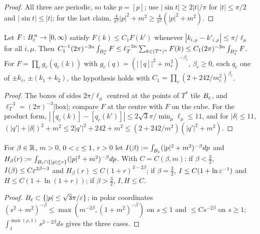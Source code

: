 \begin{proof}
All three are periodic, so take $p=[p]$; use $|\sin t|\ge2|t|/\pi$ for $|t|\le\pi/2$ and $|\sin t|\le|t|$; for the last claim, $\frac4{\pi^2}|p|^2+m^2\ge\frac4{\pi^2}(|p|^2+m^2)$.
\end{proof}

\begin{lemma}\label{lem:a06e:M1}
Let $F\colon B_{\varepsilon}^{\,n}\to[0,\infty)$ satisfy $F(k)\le C_1F(k')$ whenever $|k_{i,\mu}-k'_{i,\mu}|\le\pi/\ell_\mu$ for all $i,\mu$. Then $C_1^{-1}(2\pi)^{-3n}\int_{B_{\varepsilon}^n}F\le\ell_T^{-3n}\sum_{k\in(T^*)^n}F(k)\le C_1(2\pi)^{-3n}\int_{B_{\varepsilon}^n}F$. For $F=\prod_cg_c(q_c(k))$ with $g_c(q)=(|[q]|^2+m_c^2)^{-\beta_c}$, $\beta_c\ge0$, each $q_c$ one of $\pm k_i$, $\pm(k_1+k_2)$, the hypothesis holds with $C_1=\prod_c(2+242/m_c^2)^{\beta_c}$.
\end{lemma}

\begin{proof}
The boxes of sides $2\pi/\ell_\mu$ centred at the points of $T^*$ tile $B_{\varepsilon}$, and $\ell_T^{-3}=(2\pi)^{-3}|\text{box}|$; compare $F$ at the centre with $F$ on the cube. For the product form, $|[q_c(k)]-[q_c(k')]|\le2\sqrt3\pi/\min_\mu\ell_\mu\le11$, and for $|\delta|\le11$, $(|q'|+|\delta|)^2+m^2\le2|q'|^2+242+m^2\le(2+242/m^2)(|q'|^2+m^2)$.
\end{proof}

\begin{lemma}\label{lem:a06e:M2}
For $\beta\in\mathbb R$, $m>0$, $0<\varepsilon\le1$, $r>0$ let $I(\beta):=\int_{B_{\varepsilon}}(|p|^2+m^2)^{-\beta}dp$ and $H_\beta(r):=\int_{B_{\varepsilon}\cap\{|p|\le r\}}(|p|^2+m^2)^{-\beta}dp$. With $C=C(\beta,m)$: if $\beta<\frac32$, $I(\beta)\le C\varepsilon^{2\beta-3}$ and $H_\beta(r)\le C(1+r)^{3-2\beta}$; if $\beta=\frac32$, $I\le C(1+\ln\varepsilon^{-1})$ and $H\le C(1+\ln(1+r))$; if $\beta>\frac32$, $I,H\le C$.
\end{lemma}

\begin{proof}
$B_{\varepsilon}\subset\{|p|\le\sqrt3\pi/\varepsilon\}$; in polar coordinates $(s^2+m^2)^{-\beta}\le\max(m^{-2\beta},(1+m^2)^{-\beta})$ on $s\le1$ and $\le Cs^{-2\beta}$ on $s\ge1$; $\int_1^{\max(\rho,1)}s^{2-2\beta}ds$ gives the three cases.
\end{proof}

